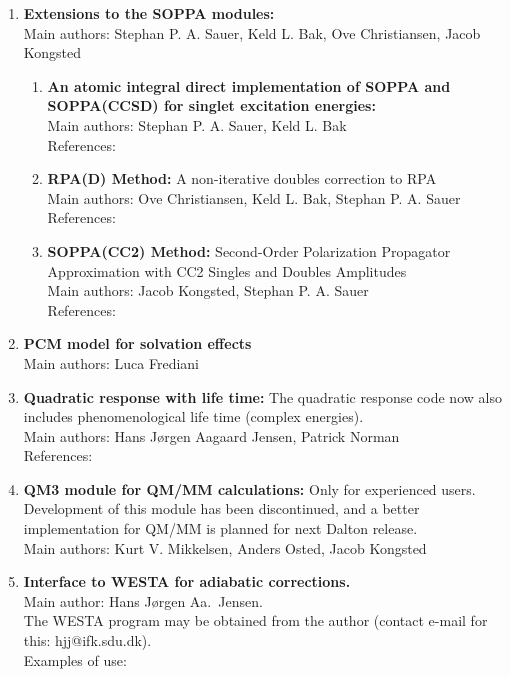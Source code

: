 \begin{enumerate}
\item{\bf Extensions to the SOPPA modules:} \\
Main authors: Stephan P. A. Sauer, Keld L. Bak, Ove Christiansen, Jacob Kongsted
\begin{enumerate}
  \item{\bf An atomic integral direct implementation of SOPPA and SOPPA(CCSD) for singlet excitation energies:}  \\
   Main authors: Stephan P. A. Sauer, Keld L. Bak \\
   References: \cite{spas037} \\
   \cite{spas089}
  \item{\bf RPA(D) Method:}
  A non-iterative doubles correction to RPA\\
   Main authors: Ove Christiansen, Keld L. Bak, Stephan P. A. Sauer \\
   References: \cite{spas025}
  \item{\bf SOPPA(CC2) Method:}
   Second-Order Polarization Propagator Approximation with CC2 Singles and Doubles
   Amplitudes\\
   Main authors: Jacob Kongsted, Stephan P. A. Sauer \\
   References: \cite{spas097}
\end{enumerate}

\item{\bf PCM model for solvation effects} \\
Main authors: Luca Frediani

\item{\bf Quadratic response with life time:} The quadratic response code now also
includes phenomenological life time (complex energies).  \\
Main authors: Hans J\o rgen Aagaard Jensen, Patrick Norman \\
References: \cite{pndmbhjajjojcp123}

\item{\bf QM3 module for QM/MM calculations:} Only for experienced users. Development of this module has been discontinued,
and a better implementation for QM/MM is planned for next Dalton release.  \\
Main authors: Kurt V. Mikkelsen, Anders Osted, Jacob Kongsted

\item{\bf Interface to WESTA for adiabatic corrections.}  \\
Main author: Hans J\o rgen Aa.\ Jensen.\\
 The WESTA program may be obtained from the author
 (contact e-mail for this: hjj@ifk.sdu.dk).\\
 Examples of use:


\end{enumerate}
